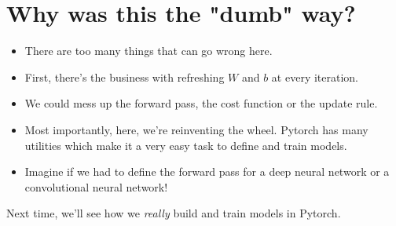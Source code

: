 \documentclass{article}
\begin{document}
    \section{Why was this the "dumb" way?}
    \begin{itemize}
        \item There are too many things that can go wrong here. 
        \item First, there's the business with refreshing $W$ and $b$ at every iteration.
        \item We could mess up the forward pass, the cost function or the update rule.
        \item Most importantly, here, we're reinventing the wheel. Pytorch has many utilities which make it 
        a very easy task to define and train models. 
        \item Imagine if we had to define the forward pass for a deep neural network or a convolutional neural network!
    \end{itemize}
    Next time, we'll see how we \emph{really} build and train models in Pytorch.
\end{document}
